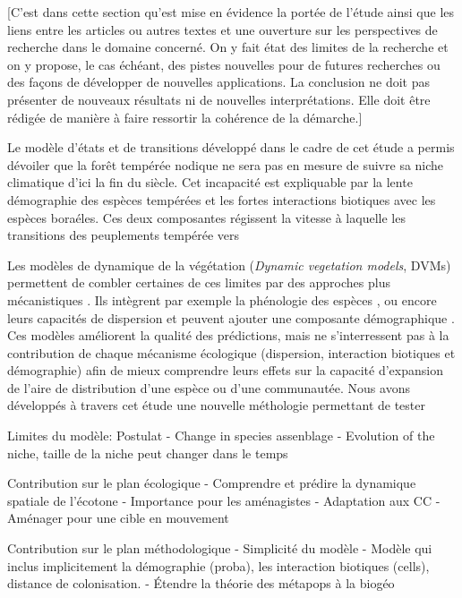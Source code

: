 [C’est dans cette section qu’est mise en évidence la portée de l’étude ainsi que les liens entre les articles ou autres textes et une ouverture sur les perspectives de recherche dans le domaine concerné. On y fait état des limites de la recherche et on y propose, le cas échéant, des pistes nouvelles pour de futures recherches ou des façons de développer de nouvelles applications. La conclusion ne doit pas présenter de nouveaux résultats ni de nouvelles interprétations. Elle doit être rédigée de manière à faire ressortir la cohérence de la démarche.]

Le modèle d'états et de transitions développé dans le cadre de cet étude a permis dévoiler que la forêt tempérée nodique ne sera pas en mesure de suivre sa niche climatique d'ici la fin du siècle. Cet incapacité est expliquable par la lente démographie des espèces tempérées et les fortes interactions biotiques avec les espèces boraéles. Ces deux composantes régissent la vitesse à laquelle les transitions des peuplements tempérée vers

Les modèles de dynamique de la végétation
(\textit{Dynamic vegetation models}, DVMs) permettent de combler certaines de ces limites par des
approches plus mécanistiques \citep{Snell2014a}. Ils intègrent par exemple la phénologie des espèces
\citep{Letters2001,Morin2008}, ou encore leurs capacités de dispersion \citep{Nobis2014,Iverson2004}
et peuvent ajouter une composante démographique \citep{Lischke2006a,Vanderwel2014}. Ces modèles
améliorent la qualité des prédictions, mais ne s'interressent pas à la contribution de chaque
mécanisme écologique (dispersion, interaction biotiques et démographie) afin de mieux comprendre
leurs effets sur la capacité d'expansion de l'aire de distribution d'une espèce ou d'une
communautée. Nous avons développés à travers cet étude une nouvelle méthologie permettant de tester

Limites du modèle:
Postulat
- Change in species assenblage
- Evolution of the niche, taille de la niche peut changer dans le temps

Contribution sur le plan écologique
- Comprendre et prédire la dynamique spatiale de l'écotone
- Importance pour les aménagistes
- Adaptation aux CC
- Aménager pour une cible en mouvement

Contribution sur le plan méthodologique
- Simplicité du modèle
- Modèle qui inclus implicitement la démographie (proba), les interaction biotiques (cells), distance de colonisation.
- Étendre la théorie des métapops à la biogéo
